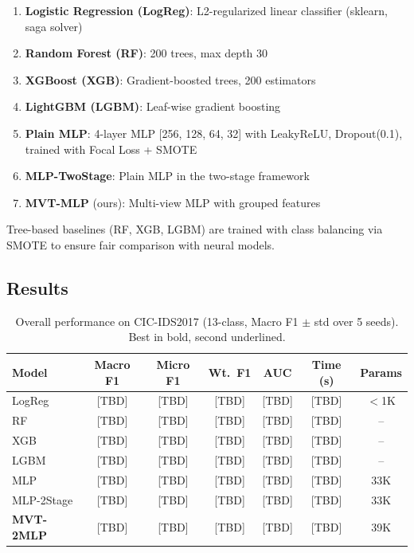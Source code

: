 \documentclass[12pt]{article}
\begin{document}
\begin{enumerate}
    \item \textbf{Logistic Regression (LogReg)}: L2-regularized linear classifier (sklearn, saga solver)
    \item \textbf{Random Forest (RF)}: 200 trees, max depth 30
    \item \textbf{XGBoost (XGB)}: Gradient-boosted trees, 200 estimators
    \item \textbf{LightGBM (LGBM)}: Leaf-wise gradient boosting
    \item \textbf{Plain MLP}: 4-layer MLP [256, 128, 64, 32] with LeakyReLU, Dropout(0.1), trained with Focal Loss + SMOTE
    \item \textbf{MLP-TwoStage}: Plain MLP in the two-stage framework
    \item \textbf{MVT-MLP} (ours): Multi-view MLP with grouped features
\end{enumerate}

Tree-based baselines (RF, XGB, LGBM) are trained with class balancing via SMOTE to ensure fair comparison with neural models.

\subsection{Results}
\label{subsec:results}

\begin{table}[t]
\centering
\caption{Overall performance on CIC-IDS2017 (13-class, Macro F1 $\pm$ std over 5 seeds). Best in bold, second underlined.}
\label{tab:cicids_results}
\begin{tabular}{lcccccc}
\toprule
\textbf{Model} & \textbf{Macro F1} & \textbf{Micro F1} & \textbf{Wt.\ F1} & \textbf{AUC} & \textbf{Time (s)} & \textbf{Params} \\
\midrule
LogReg     & [TBD] & [TBD] & [TBD] & [TBD] & [TBD] & $<$1K \\
RF         & [TBD] & [TBD] & [TBD] & [TBD] & [TBD] & -- \\
XGB        & [TBD] & [TBD] & [TBD] & [TBD] & [TBD] & -- \\
LGBM       & [TBD] & [TBD] & [TBD] & [TBD] & [TBD] & -- \\
MLP        & [TBD] & [TBD] & [TBD] & [TBD] & [TBD] & 33K \\
MLP-2Stage & [TBD] & [TBD] & [TBD] & [TBD] & [TBD] & 33K \\
\textbf{MVT-2MLP} & [TBD] & [TBD] & [TBD] & [TBD] & [TBD] & 39K \\
\bottomrule
\end{tabular}
\end{table}
\end{document}
